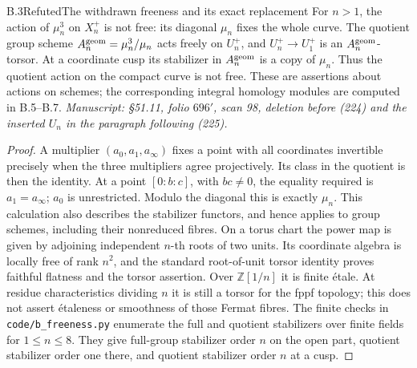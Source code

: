 \begin{statement}{B.3}{Refuted}{The withdrawn freeness and its exact replacement}
For \(n>1\), the action of \(\mu_n^3\) on \(X_n^+\) is not free:
its diagonal \(\mu_n\) fixes the whole curve. The quotient group scheme
\(A_n^{\rm geom}=\mu_n^3/\mu_n\) acts freely on \(U_n^+\), and
\(U_n^+\to U_1^+\) is an \(A_n^{\rm geom}\)-torsor.
At a coordinate cusp its stabilizer in \(A_n^{\rm geom}\) is a copy of
\(\mu_n\). Thus the quotient action on the compact curve is not free.
These are assertions about actions on schemes; the corresponding
integral homology modules are computed in B.5--B.7.
\emph{Manuscript: \S51.11, folio \(696'\), scan 98, deletion before (224)
and the inserted \(U_n\) in the paragraph following (225).}
\end{statement}
\begin{proof}
A multiplier \((a_0,a_1,a_\infty)\) fixes a point with all coordinates
invertible precisely when the three multipliers agree projectively.
Its class in the quotient is then the identity. At a point
\([0:b:c]\), with \(bc\ne0\), the equality required is
\(a_1=a_\infty\); \(a_0\) is unrestricted. Modulo the diagonal this is
exactly \(\mu_n\). This calculation also describes the stabilizer
functors, and hence applies to group schemes, including their
nonreduced fibres.
On a torus chart the power map is given by adjoining independent
\(n\)-th roots of two units. Its coordinate algebra is locally free of
rank \(n^2\), and the standard root-of-unit torsor identity proves
faithful flatness and the torsor assertion. Over \(\mathbb Z[1/n]\)
it is finite \'etale. At residue characteristics dividing \(n\) it is
still a torsor for the fppf topology; this does not assert \'etaleness or
smoothness of those Fermat fibres.
The finite checks in \texttt{code/b\_freeness.py} enumerate the
full and quotient stabilizers over finite fields for \(1\le n\le8\).
They give full-group stabilizer order \(n\) on the open part,
quotient stabilizer order one there, and quotient stabilizer
order \(n\) at a cusp.
\end{proof}

